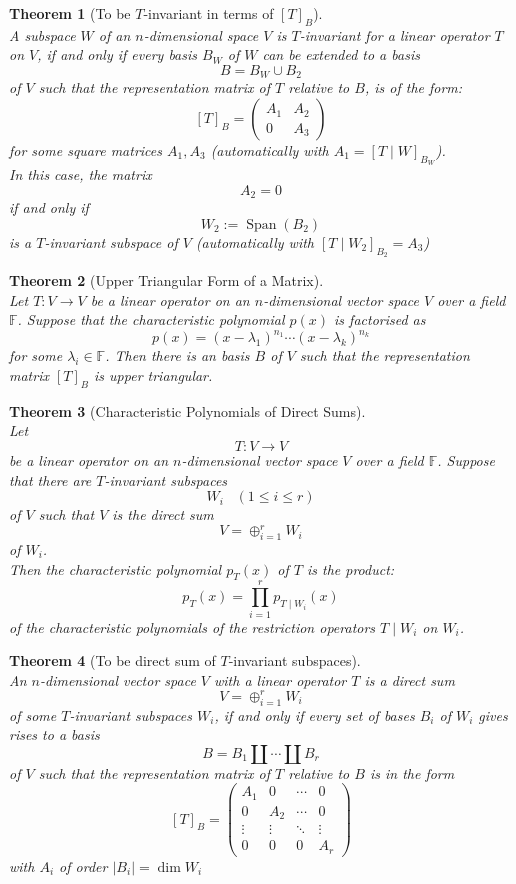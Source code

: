 \documentclass[12pt]{article}
\newtheorem{theorem}{Theorem}[section]
\theoremstyle{definition}
\DeclareMathOperator{\spn}{Span}
\begin{document}
\begin{theorem}[{To be $T$-invariant in terms of $[T]_B$}]
\hfill\\\normalfont A subspace $W$ of an $n$-dimensional space $V$ is $T$-invariant for a linear operator $T$ on $V$, if and only if every basis $B_W$ of $W$ can be extended to a basis
\[
B=B_W\cup B_2
\]
of $V$ such that the representation matrix of $T$ relative to $B$, is of the form:
\[
[T]_B=\begin{pmatrix}
A_1&A_2\\
0&A_3
\end{pmatrix}
\]
for some square matrices $A_1, A_3$ (automatically with $A_1=[T\mid W]_{B_W}$).\\
In this case, the matrix
\[
A_2=0
\]
if and only if
\[
W_2:=\spn(B_2)
\]
is a $T$-invariant subspace of $V$ (automatically with $[T\mid W_2]_{B_2}=A_3$)
\end{theorem}
\begin{theorem}[Upper Triangular Form of a Matrix]
\hfill\\\normalfont Let $T:V\to V$ be a linear operator on an $n$-dimensional vector space $V$ over a field $\mathbb{F}$. Suppose that the characteristic polynomial $p(x)$ is factorised as
\[
p(x)=(x-\lambda_1)^{n_1}\cdots(x-\lambda_k)^{n_k}
\]
for some $\lambda_i\in\mathbb{F}$. Then there is an basis $B$ of $V$ such that the representation matrix $[T]_B$ is upper triangular.
\end{theorem}
\begin{theorem}[Characteristic Polynomials of Direct Sums]
\hfill\\\normalfont Let 
\[
T:V\to V
\]
be a linear operator on an $n$-dimensional vector space $V$ over a field $\mathbb{F}$. Suppose that there are $T$-invariant subspaces
\[
W_i\;\;\;(1\leq i\leq r)
\]
of $V$ such that $V$ is the direct sum
\[
V=\oplus_{i=1}^r W_i
\]
of $W_i$.\\
Then the characteristic polynomial $p_T(x)$ of $T$ is the product:
\[
p_T(x)=\prod_{i=1}^r p_{T\mid W_i}(x)
\]
of the characteristic polynomials of the restriction operators $T\mid W_i$ on $W_i$.
\end{theorem}
\begin{theorem}[To be direct sum of $T$-invariant subspaces]
\hfill\\\normalfont An $n$-dimensional vector space $V$ with a linear operator $T$ is a direct sum
\[
V=\oplus_{i=1}^r W_i
\]
of some $T$-invariant subspaces $W_i$, if and only if every set of bases $B_i$ of $W_i$ gives rises to a basis
\[
B=B_1\coprod\cdots\coprod B_r
\]
of $V$ such that the representation matrix of $T$ relative to $B$ is in the form
\[
[T]_B = \begin{pmatrix}
A_1&0&\cdots&0\\
0&A_2&\cdots&0\\
\vdots&\vdots&\ddots&\vdots\\
0&0&0&A_r
\end{pmatrix}
\]
with $A_i$ of order $|B_i| = \dim W_i$
\end{theorem}
\end{document}
